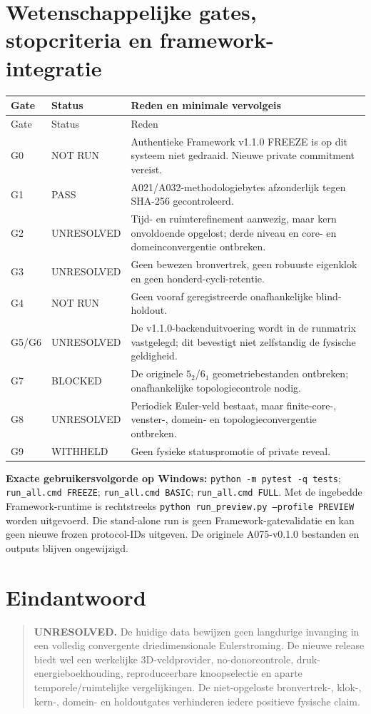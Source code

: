 \documentclass[10pt,a4paper]{article}
\begin{document}
\section{Wetenschappelijke gates, stopcriteria en framework-integratie}
\begin{longtable}{@{}p{10mm}p{25mm}p{111mm}@{}}\toprule
Gate & Status & Reden en minimale vervolgeis\\\midrule\endfirsthead\toprule Gate & Status & Reden\\\midrule\endhead
G0 & NOT RUN & Authentieke Framework v1.1.0 FREEZE is op dit systeem niet gedraaid. Nieuwe private commitment vereist.\\
G1 & PASS & A021/A032-methodologiebytes afzonderlijk tegen SHA-256 gecontroleerd.\\
G2 & UNRESOLVED & Tijd- en ruimterefinement aanwezig, maar kern onvoldoende opgelost; derde niveau en core- en domeinconvergentie ontbreken.\\
G3 & UNRESOLVED & Geen bewezen bronvertrek, geen robuuste eigenklok en geen honderd-cycli-retentie.\\
G4 & NOT RUN & Geen vooraf geregistreerde onafhankelijke blind-holdout.\\
G5/G6 & UNRESOLVED & De v1.1.0-backenduitvoering wordt in de runmatrix vastgelegd; dit bevestigt niet zelfstandig de fysische geldigheid.\\
G7 & BLOCKED & De originele $5_2$/$6_1$ geometriebestanden ontbreken; onafhankelijke topologiecontrole nodig.\\
G8 & UNRESOLVED & Periodiek Euler-veld bestaat, maar finite-core-, venster-, domein- en topologieconvergentie ontbreken.\\
G9 & WITHHELD & Geen fysieke statuspromotie of private reveal.\\\bottomrule\end{longtable}
\noindent\textbf{Exacte gebruikersvolgorde op Windows:} \texttt{python -m pytest -q tests}; \texttt{run\_all.cmd FREEZE}; \texttt{run\_all.cmd BASIC}; \texttt{run\_all.cmd FULL}. Met de ingebedde Framework-runtime is rechtstreeks \texttt{python run\_preview.py --profile PREVIEW} worden uitgevoerd. Die stand-alone run is geen Framework-gatevalidatie en kan geen nieuwe frozen protocol-IDs uitgeven. De originele A075-v0.1.0 bestanden en outputs blijven ongewijzigd.
\section{Eindantwoord}
\begin{quote}\textbf{UNRESOLVED.} De huidige data bewijzen geen langdurige invanging in een volledig convergente driedimensionale Eulerstroming. De nieuwe release biedt wel een werkelijke 3D-veldprovider, no-donorcontrole, druk-energieboekhouding, reproduceerbare knoopselectie en aparte temporele/ruimtelijke vergelijkingen. De niet-opgeloste bronvertrek-, klok-, kern-, domein- en holdoutgates verhinderen iedere positieve fysische claim.\end{quote}
\end{document}
